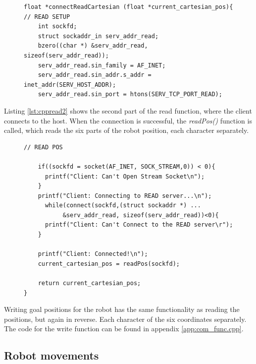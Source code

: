 \begin{figure}[H]
\begin{lstlisting}[frame = single, caption={C++ Set up host adress and port.}, captionpos=b, label={lst:cppread1}]
float *connectReadCartesian (float *current_cartesian_pos){
// READ SETUP
	int sockfd;
	struct sockaddr_in serv_addr_read;
	bzero((char *) &serv_addr_read, sizeof(serv_addr_read));
	serv_addr_read.sin_family = AF_INET;
	serv_addr_read.sin_addr.s_addr = inet_addr(SERV_HOST_ADDR);
	serv_addr_read.sin_port = htons(SERV_TCP_PORT_READ);
\end{lstlisting}
\end{figure}
Listing \ref{lst:cppread2} shows the second part of the read function, where the client connects to the host. When the connection is successful, the \emph{readPos()} function is called, which reads the six parts of the robot position, each character separately.
\begin{figure}[H]
\begin{lstlisting}[frame = single, caption={C++ connect to host and read current robot position.}, captionpos=b, label={lst:cppread2}]
// READ POS

	if((sockfd = socket(AF_INET, SOCK_STREAM,0)) < 0){
	  printf("Client: Can't Open Stream Socket\n");
	}
	printf("Client: Connecting to READ server...\n");
	  while(connect(sockfd,(struct sockaddr *) ...
		   &serv_addr_read, sizeof(serv_addr_read))<0){
	  printf("Client: Can't Connect to the READ server\r");
	}

	printf("Client: Connected!\n");
	current_cartesian_pos = readPos(sockfd);

	return current_cartesian_pos;
}
\end{lstlisting}
\end{figure}
Writing goal positions for the robot has the same functionality as reading the positions, but again in reverse. Each character of the six coordinates separately. The code for the write function can be found in appendix \ref{app:com_func.cpp}.
                       
\subsection{Robot movements}
\label{subsec:robmove}

